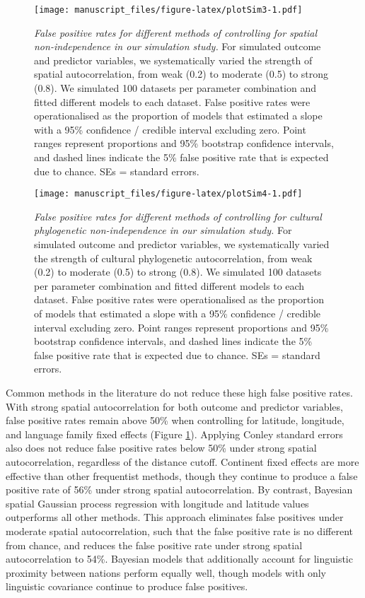 \documentclass[
  man,floatsintext]{apa6}
\begin{document}
\begin{figure}
\centering
\texttt{[image: manuscript\_files/figure-latex/plotSim3-1.pdf]}
\caption{\label{fig:plotSim3}\emph{False positive rates for different methods of controlling for spatial non-independence in our simulation study.} For simulated outcome and predictor variables, we systematically varied the strength of spatial autocorrelation, from weak (0.2) to moderate (0.5) to strong (0.8). We simulated 100 datasets per parameter combination and fitted different models to each dataset. False positive rates were operationalised as the proportion of models that estimated a slope with a 95\% confidence / credible interval excluding zero. Point ranges represent proportions and 95\% bootstrap confidence intervals, and dashed lines indicate the 5\% false positive rate that is expected due to chance. SEs = standard errors.}
\end{figure}



\begin{figure}
\centering
\texttt{[image: manuscript\_files/figure-latex/plotSim4-1.pdf]}
\caption{\label{fig:plotSim4}\emph{False positive rates for different methods of controlling for cultural phylogenetic non-independence in our simulation study.} For simulated outcome and predictor variables, we systematically varied the strength of cultural phylogenetic autocorrelation, from weak (0.2) to moderate (0.5) to strong (0.8). We simulated 100 datasets per parameter combination and fitted different models to each dataset. False positive rates were operationalised as the proportion of models that estimated a slope with a 95\% confidence / credible interval excluding zero. Point ranges represent proportions and 95\% bootstrap confidence intervals, and dashed lines indicate the 5\% false positive rate that is expected due to chance. SEs = standard errors.}
\end{figure}

Common methods in the literature do not reduce these high false positive rates. With strong spatial autocorrelation for both outcome and predictor variables, false positive rates remain above 50\% when controlling for latitude, longitude, and language family fixed effects (Figure \ref{fig:plotSim3}). Applying Conley standard errors also does not reduce false positive rates below 50\% under strong spatial autocorrelation, regardless of the distance cutoff. Continent fixed effects are more effective than other frequentist methods, though they continue to produce a false positive rate of 56\% under strong spatial autocorrelation. By contrast, Bayesian spatial Gaussian process regression with longitude and latitude values outperforms all other methods. This approach eliminates false positives under moderate spatial autocorrelation, such that the false positive rate is no different from chance, and reduces the false positive rate under strong spatial autocorrelation to 54\%. Bayesian models that additionally account for linguistic proximity between nations perform equally well, though models with only linguistic covariance continue to produce false positives.
\end{document}
